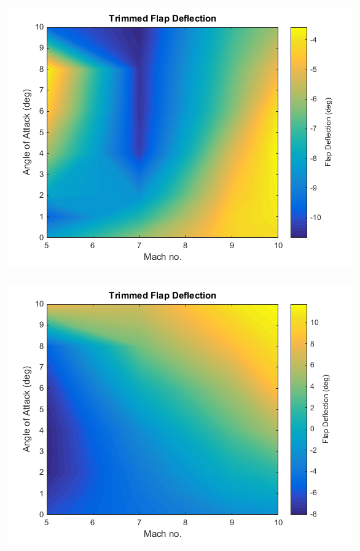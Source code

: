 \begin{figure}
\begin{subfigure}{.5\textwidth}
\centering
\includegraphics[width=0.99\linewidth]{figures/3_vehicle_design/FlapDeflectionENgineOn}
\caption{}
\label{fig:FlapDeflectionENgineOn}
\end{subfigure}
\begin{subfigure}{.5\textwidth}
	\centering
	\includegraphics[width=0.99\linewidth]{figures/3_vehicle_design/FlapDeflectionENgineOn2}
	\caption{}
	\label{fig:FlapDeflectionENgineOn2}
\end{subfigure}
\begin{subfigure}{.5\textwidth}
	\centering

\end{subfigure}
\end{figure}
